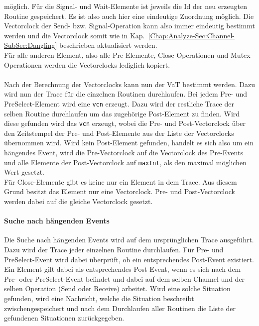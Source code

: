 möglich. Für die Signal- und Wait-Elemente ist jeweils die Id der neu erzeugten 
Routine gespeichert. Es ist also auch hier eine eindeutige Zuordnung möglich. 
Die Vectorclock der Send- bzw. Signal-Operation kann also immer eindeutig bestimmt 
werden und die Vectorclock somit wie in Kap.~\ref{Chap:Analyze-Sec:Channel-SubSec:Dangling}
beschrieben aktualisiert werden.\\
Für alle anderen Element, also alle Pre-Elemente, Close-Operationen und Mutex-Operationen 
werden die Vectorclocks lediglich kopiert.\\\\
Nach der Berechnung der Vectorclocks kann nun der VaT bestimmt werden. 
Dazu wird nun der Trace für die einzelnen Routinen durchlaufen. Bei jedem 
Pre- und PreSelect-Element wird eine \texttt{vcn} erzeugt. Dazu wird der restliche Trace 
der selben Routine durchlaufen um das zugehörige Post-Element zu finden. 
Wird diese gefunden wird 
das \texttt{vcn} erzeugt, wobei die Pre- und Post-Vectorclock über den 
Zeitstempel der Pre- und Post-Elemente aus der Liste der Vectorclocks 
übernommen wird.
Wird kein Post-Element gefunden, handelt es sich also um ein hängendes Event, 
wird die Pre-Vectorclock auf die Vectorclock des Pre-Events und alle Elemente 
der Post-Vectorclock auf \texttt{maxInt}, als den maximal möglichen Wert 
gesetzt. 
\\
Für Close-Elemente gibt es keine nur ein Element in dem Trace. Aus diesem Grund 
besitzt das Element nur eine Vectorclock. Pre- und Post-Vectorclock werden 
dabei auf die gleiche Vectorclock gesetzt.

\paragraph{Suche nach hängenden Events} Die Suche nach hängenden Events 
wird auf dem ursprünglichen Trace ausgeführt. Dazu wird der Trace jeder einzelnen 
Routine durchlaufen. Für Pre- und PreSelect-Event wird dabei überprüft, ob 
ein entsprechendes Post-Event existiert. Ein Element gilt dabei als 
entsprechendes Post-Event, wenn es sich nach dem Pre- oder PreSelect-Event 
befindet und dabei auf dem selben Channel und der selben Operation (Send oder 
Receive) arbeitet. Wird eine solche Situation gefunden, wird eine 
Nachricht, welche die Situation beschreibt zwischengespeichert
und nach dem Durchlaufen aller Routinen die Liste der gefundenen 
Situationen zurückgegeben.

